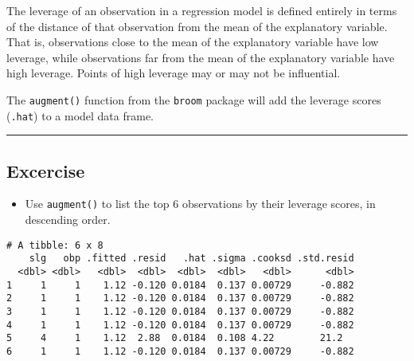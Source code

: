 \documentclass[
]{book}
\newenvironment{Shaded}{\begin{snugshade}}{\end{snugshade}}
\newcommand{\CommentTok}[1]{\textcolor[rgb]{0.56,0.35,0.01}{\textit{#1}}}
\newcommand{\DataTypeTok}[1]{\textcolor[rgb]{0.13,0.29,0.53}{#1}}
\newcommand{\KeywordTok}[1]{\textcolor[rgb]{0.13,0.29,0.53}{\textbf{#1}}}
\newcommand{\NormalTok}[1]{#1}
\newcommand{\OperatorTok}[1]{\textcolor[rgb]{0.81,0.36,0.00}{\textbf{#1}}}
\newcommand{\StringTok}[1]{\textcolor[rgb]{0.31,0.60,0.02}{#1}}
\providecommand{\tightlist}{%
  \setlength{\itemsep}{0pt}\setlength{\parskip}{0pt}}
\begin{document}
The leverage of an observation in a regression model is defined entirely in terms of the distance of that observation from the mean of the explanatory variable. That is, observations close to the mean of the explanatory variable have low leverage, while observations far from the mean of the explanatory variable have high leverage. Points of high leverage may or may not be influential.

The \texttt{augment()} function from the \texttt{broom} package will add the leverage scores (\texttt{.hat}) to a model data frame.

\begin{center}\rule{0.5\linewidth}{0.5pt}\end{center}

\hypertarget{excercise-6}{%
\subsection*{Excercise}\label{excercise-6}}

\begin{itemize}
\tightlist
\item
  Use \texttt{augment()} to list the top 6 observations by their leverage scores, in descending order.
\end{itemize}

\begin{Shaded}
\end{Shaded}

\begin{verbatim}
# A tibble: 6 x 8
    slg   obp .fitted .resid   .hat .sigma .cooksd .std.resid
  <dbl> <dbl>   <dbl>  <dbl>  <dbl>  <dbl>   <dbl>      <dbl>
1     1     1    1.12 -0.120 0.0184  0.137 0.00729     -0.882
2     1     1    1.12 -0.120 0.0184  0.137 0.00729     -0.882
3     1     1    1.12 -0.120 0.0184  0.137 0.00729     -0.882
4     1     1    1.12 -0.120 0.0184  0.137 0.00729     -0.882
5     4     1    1.12  2.88  0.0184  0.108 4.22        21.2  
6     1     1    1.12 -0.120 0.0184  0.137 0.00729     -0.882
\end{verbatim}
\end{document}
